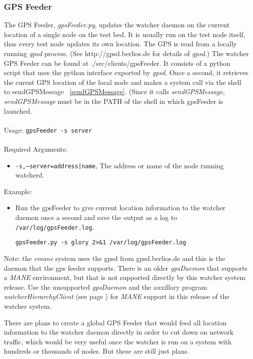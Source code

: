 \subsubsection{GPS Feeder}
\label{GPSFeeder}
The GPS Feeder, {\it gpsFeeder.py}, updates the watcher daemon on the current location of a single node on the test bed. It is usually run on the test node itself, thus 
every test node updates its own location. The GPS is read from a locally running {\it gpsd} process. (See http://gpsd.berlios.de for 
details of {\it gpsd}.) The watcher GPS Feeder can be found at ./src/clients/gpsFeeder. It consists of a python script that uses the 
python interface exported by {\it gpsd}. Once a second, it retrieves the curent GPS location of the local node and makes a system call via the shell to sendGPSMessage ~\ref{sendGPSMessage}. (Since it
calls {\it sendGPSMessage}, {\it sendGPSMessage} must be in the PATH of the shell in which gpsFeeder is launched. 
\\\\
Usage: 
{\tt gpsFeeder -s server}
\\\\
Required Arguments:
\begin{itemize}
\item {\tt -s,--server=address|name}, The address or name of the node running watcherd.
\end{itemize}
Example:
\begin{itemize}
\item Run the gpsFeeder to give current location information to the watcher daemon once a second and save the output as a log to {\tt /var/log/gpsFeeder.log}.
    
{\tt gpsFeeder.py -s glory 2>\&1 /var/log/gpsFeeder.log}
\end{itemize}

Note: the {\it emane} system uses the gpsd from gpsd.berlios.de and this is the daemon that the gps feeder supports. There is an older {\it gpsDaemon} that supports a {\it MANE} environment, but that 
is not supported directly by this watcher system release. Use the unsupported {\it gpsDaemon} and the auxillary program {\it watcherHierarchyClient} (see page \pageref{watcherHierarchyClient}) for {\it MANE} support in this release 
of the watcher system.

There are plans to create a global GPS Feeder that would feed all location information to the watcher daemon directly in order to cut down on network traffic, which 
would be very useful once the watcher is run on a system with hundreds or thousands of nodes. But these are still just plans. 

